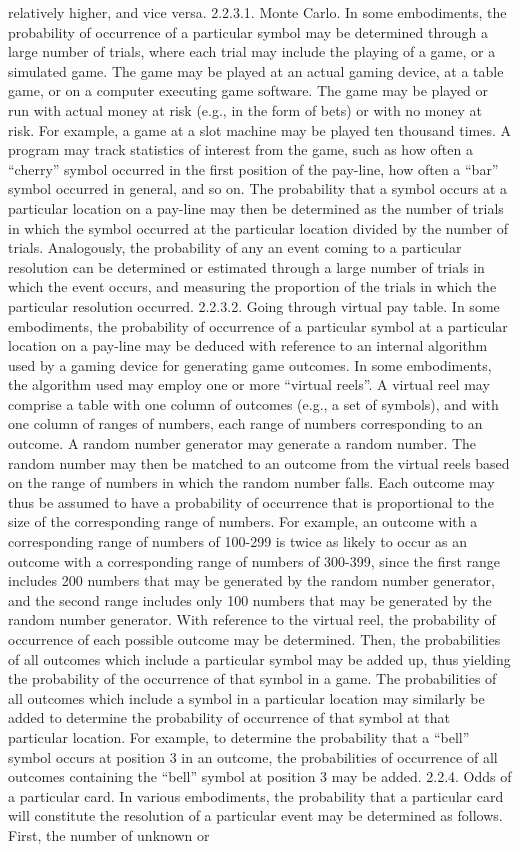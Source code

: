 \documentclass[11pt,a4paper]{article}
\begin{document}
relatively higher, and vice versa. 2.2.3.1. Monte Carlo. In some embodiments, the probability of occurrence of a particular symbol may be determined through a large number of trials, where each trial may include the playing of a game, or a simulated game. The game may be played at an actual gaming device, at a table game, or on a computer executing game software. The game may be played or run with actual money at risk (e.g., in the form of bets) or with no money at risk. For example, a game at a slot machine may be played ten thousand times. A program may track statistics of interest from the game, such as how often a “cherry” symbol occurred in the first position of the pay-line, how often a “bar” symbol occurred in general, and so on. The probability that a symbol occurs at a particular location on a pay-line may then be determined as the number of trials in which the symbol occurred at the particular location divided by the number of trials. Analogously, the probability of any an event coming to a particular resolution can be determined or estimated through a large number of trials in which the event occurs, and measuring the proportion of the trials in which the particular resolution occurred. 2.2.3.2. Going through virtual pay table. In some embodiments, the probability of occurrence of a particular symbol at a particular location on a pay-line may be deduced with reference to an internal algorithm used by a gaming device for generating game outcomes. In some embodiments, the algorithm used may employ one or more “virtual reels”. A virtual reel may comprise a table with one column of outcomes (e.g., a set of symbols), and with one column of ranges of numbers, each range of numbers corresponding to an outcome. A random number generator may generate a random number. The random number may then be matched to an outcome from the virtual reels based on the range of numbers in which the random number falls. Each outcome may thus be assumed to have a probability of occurrence that is proportional to the size of the corresponding range of numbers. For example, an outcome with a corresponding range of numbers of 100-299 is twice as likely to occur as an outcome with a corresponding range of numbers of 300-399, since the first range includes 200 numbers that may be generated by the random number generator, and the second range includes only 100 numbers that may be generated by the random number generator. With reference to the virtual reel, the probability of occurrence of each possible outcome may be determined. Then, the probabilities of all outcomes which include a particular symbol may be added up, thus yielding the probability of the occurrence of that symbol in a game. The probabilities of all outcomes which include a symbol in a particular location may similarly be added to determine the probability of occurrence of that symbol at that particular location. For example, to determine the probability that a “bell” symbol occurs at position 3 in an outcome, the probabilities of occurrence of all outcomes containing the “bell” symbol at position 3 may be added. 2.2.4. Odds of a particular card. In various embodiments, the probability that a particular card will constitute the resolution of a particular event may be determined as follows. First, the number of unknown or 
\end{document}
